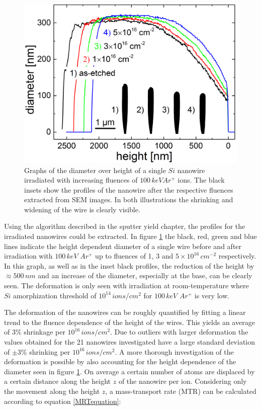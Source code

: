 \documentclass[12pt,
paper=a4,				
DIV=calc,		  %
BCOR=16mm,	  %
headinclude,
openany
]{scrbook}
\begin{document}
\begin{figure}
	\centering
		\includegraphics[width=.48\textwidth]{images/deformationprofile.jpg}
	\caption{Graphs of the diameter over height of a single $Si$ nanowire irradiated with increasing fluences of $100\,keV Ar^+$ ions. The black insets show the profiles of the nanowire after the respective fluences extracted from SEM images. In both illustrations the shrinking and widening of the wire is clearly visible.} 
	\label{deformationprofile}
\end{figure}

Using the algorithm described in the sputter yield chapter, the profiles for the irradiated nanowires could be extracted. In figure \ref{deformationprofile} the black, red, green and blue lines indicate the height dependent diameter of a single wire before and after irradiation with $100\,keV\,\,Ar^+$ up to fluences of 1, 3 and $5 \times 10^{16}\,cm^{-2}$ respectively. In this graph, as well as in the inset black profiles, the reduction of the height by $\approx 500\,nm$ and an increase of the diameter, especially at the base, can be clearly seen. The deformation is only seen with irradiation at room-temperature where $Si$ amorphization threshold of $10^{14}\,ions/cm^2$ for $100\,keV\,\,Ar^+$ is very low.

The deformation of the nanowires can be roughly quantified by fitting a linear trend to the fluence dependence of the height of the wires. This yields an average of $3\%$ shrinkage per $10^{16}\,ions/cm^2$. Due to outliers with larger deformation the values obtained for the 21 nanowires investigated have a large standard deviation of $\pm 3\%$ shrinking per $10^{16}\,ions/cm^2$. A more thorough investigation of the deformation is possible by also accounting for the height dependence of the diameter seen in figure \ref{deformationprofile}. On average a certain number of atoms are displaced by a certain distance along the height $z$ of the nanowire per ion. Considering only the movement along the height $z$, a mass-transport rate (MTR) can be calculated according to equation \ref{MRTequation}:
\end{document}
